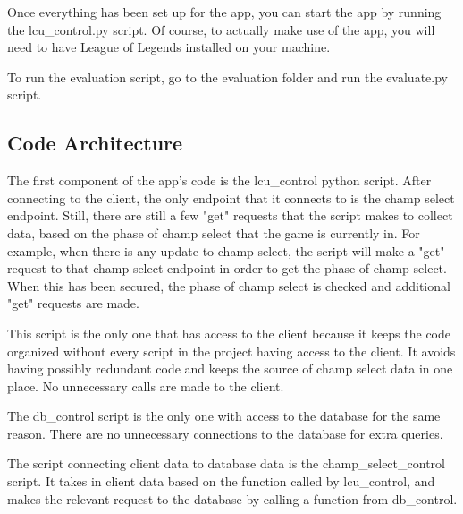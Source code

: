 \documentclass[10pt,twocolumn]{article}
\begin{document}
Once everything has been set up for the app, you can start the app by running the lcu\_control.py script.
Of course, to actually make use of the app, you will need to have League of Legends installed on your machine.

To run the evaluation script, go to the evaluation folder and run the evaluate.py script.

\subsection{Code Architecture}
The first component of the app's code is the lcu\_control python script.
After connecting to the client, the only endpoint that it connects to is the champ select endpoint.
Still, there are still a few "get" requests that the script makes to collect data, based on the phase of champ select that the game is currently in.
For example, when there is any update to champ select, the script will make a "get" request to that champ select endpoint in order to get the phase of champ select.
When this has been secured, the phase of champ select is checked and additional "get" requests are made.

This script is the only one that has access to the client because it keeps the code organized without every script in the project having access to the client.
It avoids having possibly redundant code and keeps the source of champ select data in one place.
No unnecessary calls are made to the client.

The db\_control script is the only one with access to the database for the same reason.
There are no unnecessary connections to the database for extra queries.

The script connecting client data to database data is the champ\_select\_control script.
It takes in client data based on the function called by lcu\_control, and makes the relevant request to the database by calling a function from db\_control.


\printbibliography
\end{document}
